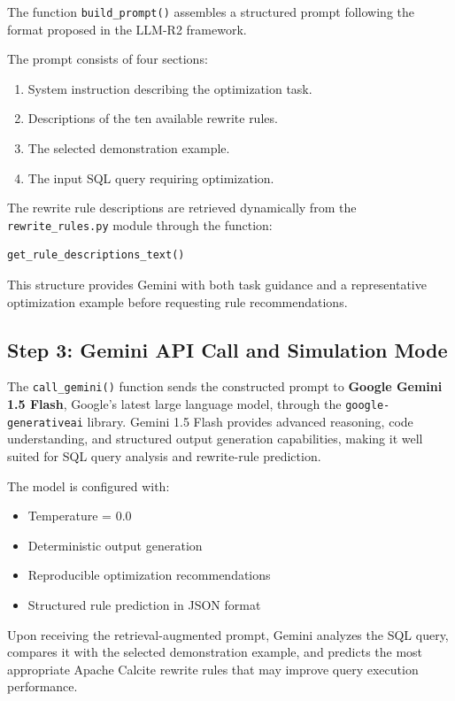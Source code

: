 \documentclass[12pt,a4paper]{article}
\begin{document}
The function \texttt{build\_prompt()} assembles a structured prompt following the format proposed in the LLM-R2 framework.

The prompt consists of four sections:

\begin{enumerate}
    \item System instruction describing the optimization task.
    \item Descriptions of the ten available rewrite rules.
    \item The selected demonstration example.
    \item The input SQL query requiring optimization.
\end{enumerate}

The rewrite rule descriptions are retrieved dynamically from the \texttt{rewrite\_rules.py} module through the function:

\begin{lstlisting}[language=Python,basicstyle=\ttfamily\small]
get_rule_descriptions_text()
\end{lstlisting}

This structure provides Gemini with both task guidance and a representative optimization example before requesting rule recommendations.

\subsection{Step 3: Gemini API Call and Simulation Mode}

The \texttt{call\_gemini()} function sends the constructed prompt to
\textbf{Google Gemini 1.5 Flash}, Google's latest large language model,
through the \texttt{google-generativeai} library. Gemini 1.5 Flash
provides advanced reasoning, code understanding, and structured output
generation capabilities, making it well suited for SQL query analysis
and rewrite-rule prediction.

The model is configured with:

\begin{itemize}
    \item Temperature = 0.0
    \item Deterministic output generation
    \item Reproducible optimization recommendations
    \item Structured rule prediction in JSON format
\end{itemize}

Upon receiving the retrieval-augmented prompt, Gemini analyzes the SQL
query, compares it with the selected demonstration example, and predicts
the most appropriate Apache Calcite rewrite rules that may improve query
execution performance.
\end{document}
